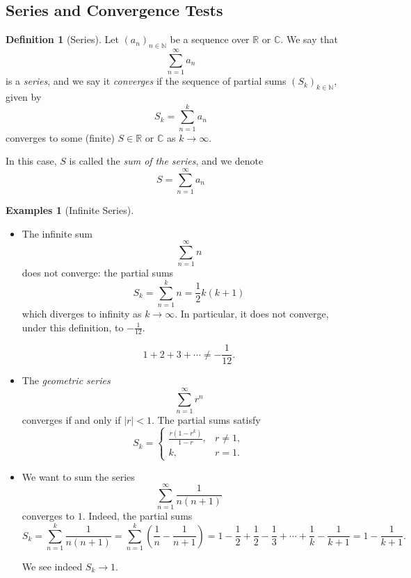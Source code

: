 \documentclass[11pt]{article}
\numberwithin{equation}{section}
\theoremstyle{definition}
\newtheorem{definition}[theorem]{Definition}
\newtheorem{examples}[theorem]{Examples}
\theoremstyle{remark}
\newcommand{\pqty}[1]{\left(#1\right)}
\newcommand{\abs}[1]{\left|#1\right|}
\newcommand{\RR}{\mathbb R}
\newcommand{\CC}{\mathbb C}
\newcommand{\NN}{\mathbb N}
\begin{document}
\subsection{Series and Convergence Tests}

\begin{definition}[Series]\label{analysis-unit-0030}
    Let \(\pqty{a_n}_{n \in \NN}\) be a sequence over \(\RR\) or \(\CC\). We say that
    \[
        \sum_{n = 1}^{\infty} a_n
    \]
    is a \emph{series}, and we say it \emph{converges} if the sequence of partial sums \(\pqty{S_k}_{k \in \NN}\), given by
    \[
        S_k = \sum_{n = 1}^{k} a_n
    \]
    converges to some (finite) \(S \in \RR\) or \(\CC\) as \(k \to \infty\).

    In this case, \(S\) is called the \emph{sum of the series}, and we denote
    \[
        S = \sum_{n = 1}^{\infty} a_n
    \]
\end{definition}

\begin{examples}[Infinite Series]\label{analysis-unit-0031}
    \label{ex:seq-infinite-series}
    \begin{itemize}
        \item The infinite sum
        \[
            \sum_{n = 1}^{\infty} n
        \]
        does not converge: the partial sums
        \[
            S_k = \sum_{n = 1}^{k} n = \frac{1}{2} k \pqty{k + 1}
        \]
        which diverges to infinity as \(k \to \infty\). In particular, it does not converge, under this definition,  to \(- \frac{1}{12}\).

        \[
            1 + 2 + 3 + \cdots \neq - \frac{1}{12}.
        \]

        \item The \emph{geometric series}
        \[
            \sum_{n = 1}^{\infty} r^n
        \]
        converges if and only if \(\abs{r} < 1\). The partial sums satisfy
        \[
            S_k = \begin{cases}
                \frac{r(1-r^k)}{1-r}, & r\ne1, \\
                k, & r = 1.
            \end{cases}
        \]


        \item We want to sum the series
        \[
            \sum_{n = 1}^{\infty} \frac{1}{n \pqty{n + 1}}
        \]
        converges to \(1\). Indeed, the partial sums
        \[
            S_k = \sum_{n = 1}^{k} \frac{1}{n \pqty{n + 1}} = \sum_{n = 1}^{k} \pqty{\frac{1}{n} - \frac{1}{n + 1}} = 1 - \frac{1}{2} + \frac{1}{2} - \frac{1}{3} + \cdots + \frac{1}{k} - \frac{1}{k + 1} = 1 - \frac{1}{k + 1}.
        \]

        We see indeed \(S_k \to 1\).
    \end{itemize}
\end{examples}
\end{document}
